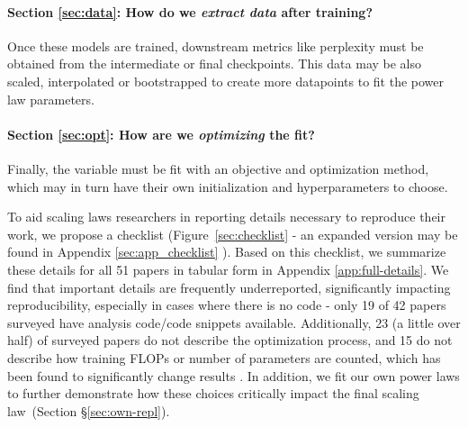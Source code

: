 \paragraph{Section \ref{sec:data}: How do we \textit{extract data} after training?} Once these models are trained, downstream metrics like perplexity must be obtained from the intermediate or final checkpoints. This data may be also scaled, interpolated or bootstrapped to create more datapoints to fit the power law parameters.

\vspace{-5mm}
\paragraph{Section \ref{sec:opt}: How are we \textit{optimizing} the fit?} Finally, the variable must be fit with an objective and optimization method, which may in turn have their own initialization and hyperparameters to choose.

To aid scaling laws researchers in reporting details necessary to reproduce their work, we propose a checklist  (Figure~\ref{sec:checklist} - an expanded version may be found in Appendix \ref{sec:app_checklist} ). Based on this checklist, we summarize these details for all 51 papers in tabular form in Appendix \ref{app:full-details}. 
We find that important details are frequently underreported, significantly impacting reproducibility, especially in cases where there is no code - only 19 of 42 papers surveyed have analysis code/code snippets available. Additionally, 23 (a little over half) of surveyed papers do not describe the optimization process, and 15 do not describe how training FLOPs or number of parameters are counted, which has been found to significantly change results \citep{porian2024resolving}. 
In addition, we fit our own power laws to further demonstrate how these choices critically impact the final scaling law~(Section \S\ref{sec:own-repl}). 










